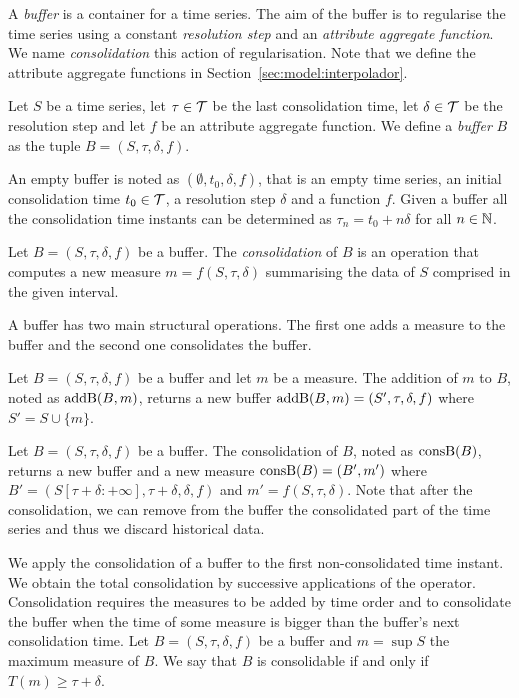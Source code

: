 A \emph{buffer} is a container for a time series. The aim of the
buffer is to regularise the time series using a constant
\emph{resolution step} and an \emph{attribute aggregate function}.  We
name \emph{consolidation} this action of regularisation.  Note that we
define the attribute aggregate functions in
Section~\ref{sec:model:interpolador}.

\begin{definition}[Buffer]
  Let $S$ be a time series, let $\tau\in\cal{T}$ be the last
  consolidation time, let $\delta\in\cal{T}$ be the resolution step
  and let $f$ be an attribute aggregate function. We define a
  \emph{buffer} $B$ as the tuple $B=(S,\tau,\delta,f)$.
\end{definition}

An empty buffer is noted as $(\emptyset, t_0, \delta, f)$, that is an
empty time series, an initial consolidation time $t_0\in\cal{T}$, a
resolution step $\delta$ and a function $f$.  Given a buffer all the
consolidation time instants can be determined as $\tau_n=t_0+n\delta$
for all $n\in\mathbb{N}$.

Let $B=(S, \tau, \delta, f)$ be a buffer. The \emph{consolidation} of
$B$ is an operation that computes a new measure $m=f(S, \tau, \delta)$
summarising the data of $S$ comprised in the given interval.

A buffer has two main structural operations. The first one adds a
measure to the buffer and the second one consolidates the buffer.

Let $B=(S,\tau,\delta,f)$ be a buffer and let $m$ be a measure.  The
addition of $m$ to $B$, noted as $\operatorname{addB}(B,m)$, returns a new buffer
$\operatorname{addB}(B,m)=(S',\tau,\delta,f)$ where $S' = S \cup \{m\}$.

Let $B=(S,\tau,\delta,f)$ be a buffer. The consolidation of $B$, noted
as $\operatorname{consB}(B)$, returns a new buffer and a new measure $\operatorname{consB}(B)=
(B',m')$ where $ B'= (S[\tau+\delta:+\infty], \tau+\delta,\delta,f)$
and $m' = f(S,\tau,\delta)$. Note that after the consolidation, we can
remove from the buffer the consolidated part of the time series and
thus we discard historical data.

We apply the consolidation of a buffer to the first non-consolidated
time instant. We obtain the total consolidation by successive
applications of the operator. Consolidation requires the measures to
be added by time order and to consolidate the buffer when the time of
some measure is bigger than the buffer's next consolidation time.  Let
$B=(S,\tau,\delta,f)$ be a buffer and $m=\sup S$ the maximum measure
of $B$. We say that $B$ is consolidable if and only if $T(m) \geq
\tau+\delta$.

